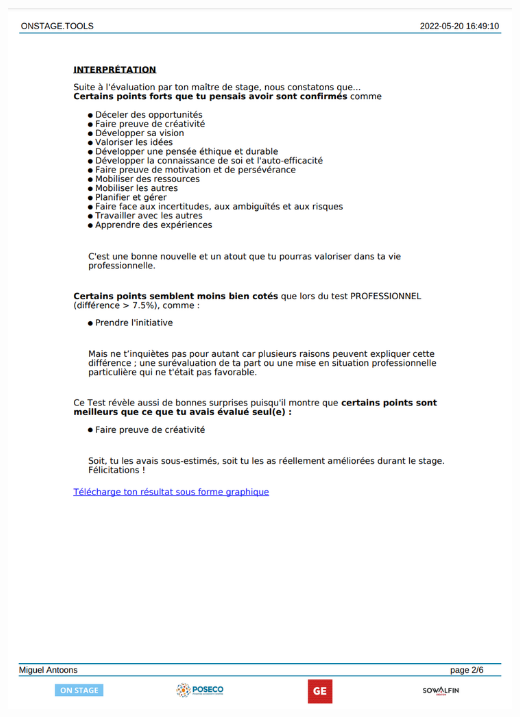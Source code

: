 \documentclass[11pt]{article}
\begin{document}
\includegraphics*[scale=0.34]{Screenshot from 2022-05-22 21-04-00.png}

\newpage
\end{document}
